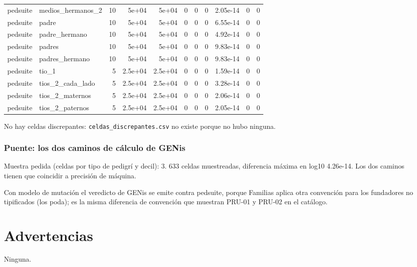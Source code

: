 \documentclass[11pt,a4paper]{article}
\begin{document}
\begin{longtable}{@{}llrrrrrrrrr@{}}
pedsuite & medios\_hermanos\_2 & 10 & 5e+04 & 5e+04 & 0 & 0 & 0 & 2.05e-14 & 0 & 0 \\
pedsuite & padre & 10 & 5e+04 & 5e+04 & 0 & 0 & 0 & 6.55e-14 & 0 & 0 \\
pedsuite & padre\_hermano & 10 & 5e+04 & 5e+04 & 0 & 0 & 0 & 4.92e-14 & 0 & 0 \\
pedsuite & padres & 10 & 5e+04 & 5e+04 & 0 & 0 & 0 & 9.83e-14 & 0 & 0 \\
pedsuite & padres\_hermano & 10 & 5e+04 & 5e+04 & 0 & 0 & 0 & 9.83e-14 & 0 & 0 \\
pedsuite & tio\_1 & 5 & 2.5e+04 & 2.5e+04 & 0 & 0 & 0 & 1.59e-14 & 0 & 0 \\
pedsuite & tios\_2\_cada\_lado & 5 & 2.5e+04 & 2.5e+04 & 0 & 0 & 0 & 3.28e-14 & 0 & 0 \\
pedsuite & tios\_2\_maternos & 5 & 2.5e+04 & 2.5e+04 & 0 & 0 & 0 & 2.06e-14 & 0 & 0 \\
pedsuite & tios\_2\_paternos & 5 & 2.5e+04 & 2.5e+04 & 0 & 0 & 0 & 2.05e-14 & 0 & 0 \\
\end{longtable}
\endgroup
No hay celdas discrepantes: \texttt{celdas\_discrepantes.csv} no existe porque no hubo ninguna.

\subsubsection{Puente: los dos caminos de cálculo de GENis}
Muestra pedida (celdas por tipo de pedigrí y decil): 3. 633 celdas muestreadas, diferencia máxima en log10 4.26e-14. Los dos caminos tienen que coincidir a precisión de máquina.

Con modelo de mutación el veredicto de GENis se emite contra pedsuite, porque Familias aplica otra convención para los fundadores no tipificados (los poda); es la misma diferencia de convención que muestran PRU-01 y PRU-02 en el catálogo.

\section{Advertencias}
Ninguna.
\end{document}
